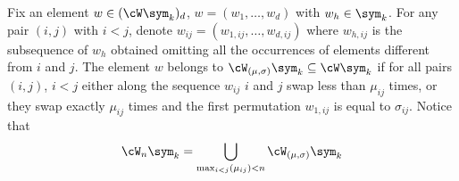 \begin{definition}
	Fix an element $w\in (\cW\sym_k)_{d}$, $w=(w_{1},\dots , w_{d})$ with $w_{h}\in \sym_k$.
	For any pair $(i,j)$ with $i< j$, denote $w_{ij}=(w_{1,ij},\dots , w_{d,ij})$ where $w_{h,ij}$ is the subsequence of $w_{h}$ obtained omitting all the occurrences of elements different from $i$ and $j$.
	The element $w$ belongs to $\cW_{(\mu,\sigma)}\sym_k\subseteq \cW\sym_k$ if for all pairs $(i,j)$, $i< j$ either along the sequence $w_{ij}$ $i$ and $j$ swap less than $\mu_{ij}$ times,
	or they swap exactly $\mu_{ij}$ times and the first permutation $w_{1,ij}$ is equal to $\sigma_{ij}$.
	Notice that
	\begin{equation*}
		\label{def}
		\cW_{n}\sym_k=\bigcup_{\max_{i<j} (\mu_{ij})< n} \cW_{(\mu,\sigma)}\sym_{k}
	\end{equation*}
	\\
	\\
\end{definition}

